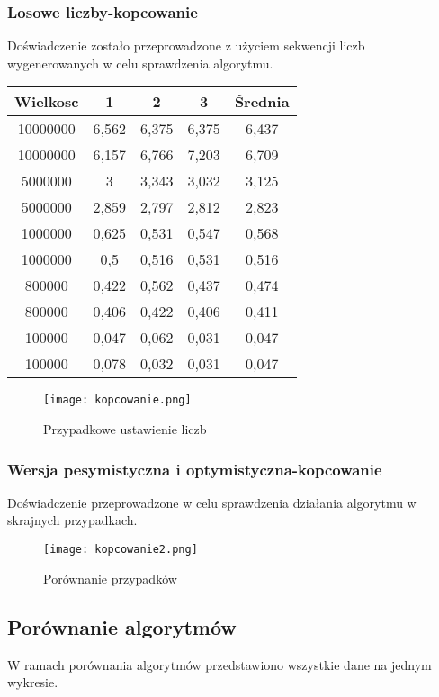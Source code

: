 \documentclass[12pt,a4paper,titlepage]{article}
\begin{document}
\subsubsection{Losowe liczby-kopcowanie}
Doświadczenie zostało przeprowadzone z użyciem sekwencji liczb wygenerowanych w celu sprawdzenia algorytmu.

\begin{center}
\begin {tabular}{|c|c|c|c|c|}\hline
Wielkosc & 1 & 2 & 3 & Średnia \\\hline
10000000&6,562&6,375&6,375&6,437\\\hline
10000000&6,157&6,766&7,203&6,709\\\hline
5000000&3&3,343&3,032&3,125\\\hline
5000000&2,859&2,797&2,812&2,823\\\hline
1000000&0,625&0,531&0,547&0,568\\\hline
1000000&0,5&0,516&0,531&0,516\\\hline
800000&0,422&0,562&0,437&0,474\\\hline
800000&0,406&0,422&0,406&0,411\\\hline
100000&0,047&0,062&0,031&0,047\\\hline
100000&0,078&0,032&0,031&0,047\\\hline
\end{tabular}
\end {center}
\begin{figure}[h]
\begin{center}
\texttt{[image: kopcowanie.png]}
\caption{Przypadkowe ustawienie liczb}
\end{center}
\end{figure}

\subsubsection{Wersja pesymistyczna i optymistyczna-kopcowanie}
Doświadczenie przeprowadzone w celu sprawdzenia działania algorytmu w skrajnych przypadkach.


\begin{figure}[h]
\begin{center}
\texttt{[image: kopcowanie2.png]}
\caption{Porównanie przypadków}
\end{center}
\end{figure}

\newpage
\subsection{Porównanie algorytmów}
W ramach porównania algorytmów przedstawiono wszystkie dane na jednym wykresie.
\end{document}

